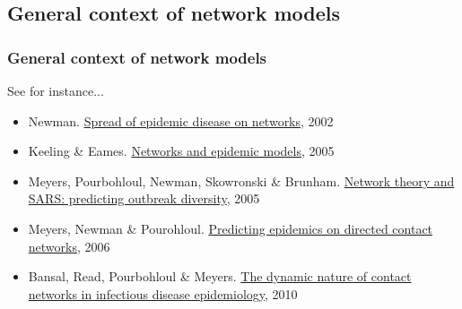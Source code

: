 \documentclass[aspectratio=43]{beamer}
\begin{document}
% 
% 
% 
% 
% 

\subsection{General context of network models}

\subsubsection{General context of network models}

% 

\begin{frame}{See for instance...}
\begin{itemize}
\item Newman. \href{https://doi.org/10.1103/PhysRevE.66.016128}{Spread of epidemic disease on networks}, 2002
\item Keeling \& Eames. \href{https://doi.org/10.1098/rsif.2005.0051}{Networks and epidemic models}, 2005
\item Meyers, Pourbohloul, Newman, Skowronski \& Brunham. \href{https://doi.org/10.1016/j.jtbi.2004.07.026}{Network theory and SARS: predicting outbreak diversity}, 2005
\item Meyers, Newman \& Pourohloul. \href{https://doi.org/10.1016/j.jtbi.2005.10.004}{Predicting epidemics on directed contact networks}, 2006
\item Bansal, Read, Pourbohloul \& Meyers. \href{https://doi.org/10.1080/17513758.2010.503376}{The dynamic nature of contact networks in infectious disease epidemiology}, 2010
\end{itemize}
\end{frame} 
\end{document}
